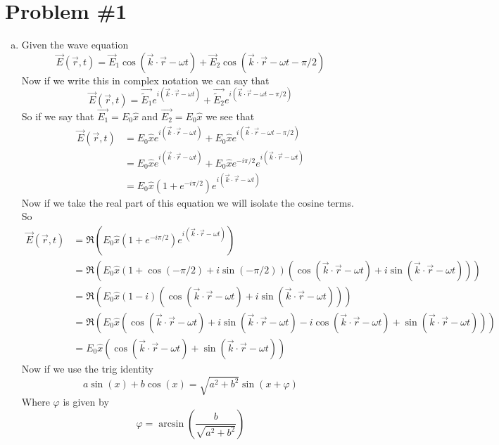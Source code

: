 \documentclass[11pt]{article}
\numberwithin{equation}{section}
\begin{document}


\section{Problem \#1}
\begin{enumerate}[(a)]
\item
Given the wave equation
$$\vec{E}(\vec{r},t) = \vec{E}_1\cos(\vec{k}\cdot\vec{r}-\omega t) + \vec{E}_2\cos(\vec{k}\cdot\vec{r}-\omega t-\pi/2)$$
Now if we write this in complex notation we can say that
$$\vec{E}(\vec{r},t) = \vec{\widetilde{E}_1}e^{i(\vec{k}\cdot\vec{r}-\omega t)} + \vec{\widetilde{E}_2}e^{i(\vec{k}\cdot\vec{r}-\omega t - \pi/2)}$$
So if we say that $\vec{E_1} = E_0\hat{x}$ and $\vec{E_2} = E_0\hat{x}$ we see that
\begin{align*}
\vec{E}(\vec{r},t) &= E_0\hat{x}e^{i(\vec{k}\cdot\vec{r}-\omega t)} + E_0\hat{x}e^{i(\vec{k}\cdot\vec{r}-\omega t - \pi/2)}\\
&= E_0\hat{x}e^{i(\vec{k}\cdot\vec{r}-\omega t)} + E_0\hat{x}e^{-i\pi/2}e^{i(\vec{k}\cdot\vec{r}-\omega t)}\\
&= E_0\hat{x}\left(1+e^{-i\pi/2}\right)e^{i(\vec{k}\cdot\vec{r}-\omega t)}
\end{align*}
Now if we take the real part of this equation we will isolate the cosine terms. So
\begin{align*}
\vec{E}(\vec{r},t) &= \Re\left(E_0\hat{x}\left(1+e^{-i\pi/2}\right)e^{i(\vec{k}\cdot\vec{r}-\omega t)}\right)\\
&= \Re\left(E_0\hat{x}\left(1+\cos(-\pi/2)+i\sin(-\pi/2)\right)\left(\cos(\vec{k}\cdot\vec{r}-\omega t) + i\sin(\vec{k}\cdot\vec{r}-\omega t)\right)\right)\\
&= \Re\left(E_0\hat{x}\left(1-i\right)\left(\cos(\vec{k}\cdot\vec{r}-\omega t) + i\sin(\vec{k}\cdot\vec{r}-\omega t)\right)\right)\\
&= \Re\left(E_0\hat{x}\left(\cos(\vec{k}\cdot\vec{r}-\omega t) + i\sin(\vec{k}\cdot\vec{r}-\omega t)- i\cos(\vec{k}\cdot\vec{r}-\omega t) + \sin(\vec{k}\cdot\vec{r}-\omega t)\right)\right)\\
&= E_0\hat{x}\left(\cos(\vec{k}\cdot\vec{r}-\omega t) + \sin(\vec{k}\cdot\vec{r}-\omega t)\right)
\end{align*}
Now if we use the trig identity 
\begin{equation} 
a\sin(x)+b\cos(x) = \sqrt{a^2+b^2}\sin(x+\varphi)
\label{TrigInd} 
\end{equation} 
Where $\varphi$ is given by
$$\varphi = \arcsin\left(\frac{b}{\sqrt{a^2+b^2}}\right)$$

\end{enumerate}
\end{document}
